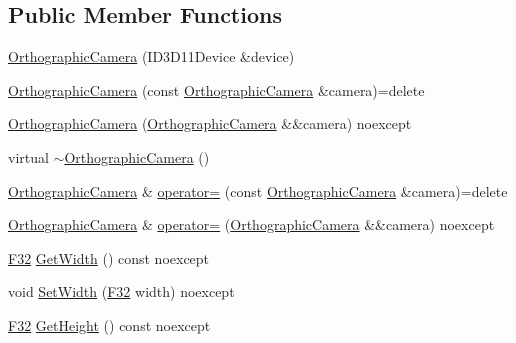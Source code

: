 \subsection*{Public Member Functions}
\begin{DoxyCompactItemize}
\item 
\hyperlink{classmage_1_1rendering_1_1_orthographic_camera_aba148b4da1141b5fa3dfc684e86dfc16}{Orthographic\+Camera} (I\+D3\+D11\+Device \&device)
\item 
\hyperlink{classmage_1_1rendering_1_1_orthographic_camera_a0bd37447138230a1a4900f503a2d1299}{Orthographic\+Camera} (const \hyperlink{classmage_1_1rendering_1_1_orthographic_camera}{Orthographic\+Camera} \&camera)=delete
\item 
\hyperlink{classmage_1_1rendering_1_1_orthographic_camera_a5b2c7d870e2077807057246abf3b76b1}{Orthographic\+Camera} (\hyperlink{classmage_1_1rendering_1_1_orthographic_camera}{Orthographic\+Camera} \&\&camera) noexcept
\item 
virtual \hyperlink{classmage_1_1rendering_1_1_orthographic_camera_a469e4af1c85a332b8feded9f577a05f6}{$\sim$\+Orthographic\+Camera} ()
\item 
\hyperlink{classmage_1_1rendering_1_1_orthographic_camera}{Orthographic\+Camera} \& \hyperlink{classmage_1_1rendering_1_1_orthographic_camera_adcd0a977ed5245aa4224dd1a679586f7}{operator=} (const \hyperlink{classmage_1_1rendering_1_1_orthographic_camera}{Orthographic\+Camera} \&camera)=delete
\item 
\hyperlink{classmage_1_1rendering_1_1_orthographic_camera}{Orthographic\+Camera} \& \hyperlink{classmage_1_1rendering_1_1_orthographic_camera_aa4518e7ef41bc0d841719198ac59d41f}{operator=} (\hyperlink{classmage_1_1rendering_1_1_orthographic_camera}{Orthographic\+Camera} \&\&camera) noexcept
\item 
\hyperlink{namespacemage_aa97e833b45f06d60a0a9c4fc22ae02c0}{F32} \hyperlink{classmage_1_1rendering_1_1_orthographic_camera_a2e1bd4bec2bebac046b122bfd62b8960}{Get\+Width} () const noexcept
\item 
void \hyperlink{classmage_1_1rendering_1_1_orthographic_camera_a407e9492f8108bd8a1e0775c63510457}{Set\+Width} (\hyperlink{namespacemage_aa97e833b45f06d60a0a9c4fc22ae02c0}{F32} width) noexcept
\item 
\hyperlink{namespacemage_aa97e833b45f06d60a0a9c4fc22ae02c0}{F32} \hyperlink{classmage_1_1rendering_1_1_orthographic_camera_a28f5a12f9c137fd2c76a17fd5f5565c1}{Get\+Height} () const noexcept
\item 

\end{DoxyCompactItemize}
